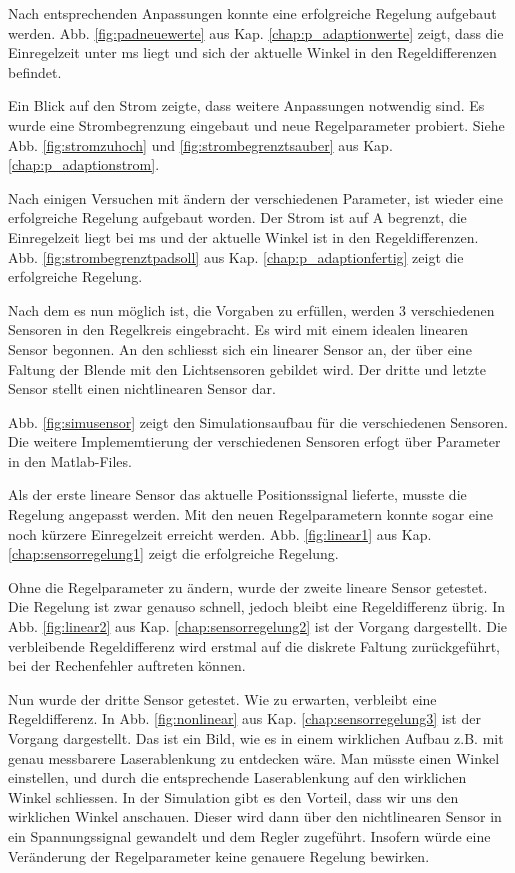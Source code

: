Nach entsprechenden Anpassungen konnte eine erfolgreiche Regelung aufgebaut werden.
Abb. \ref{fig:padneuewerte} aus Kap. \ref{chap:p_adaptionwerte} zeigt, dass die Einregelzeit unter \unit[1]{ms} liegt und sich der aktuelle Winkel in den Regeldifferenzen 
befindet.

Ein Blick auf den Strom zeigte, dass weitere Anpassungen notwendig sind.
Es wurde eine Strombegrenzung eingebaut und neue Regelparameter probiert.
Siehe Abb. \ref{fig:stromzuhoch} und \ref{fig:strombegrenztsauber} aus Kap. \ref{chap:p_adaptionstrom}.

Nach einigen Versuchen mit ändern der verschiedenen Parameter, ist wieder eine erfolgreiche Regelung aufgebaut worden.
Der Strom ist auf \unit[10]{A} begrenzt, die Einregelzeit liegt bei \unit[1]{ms} und der aktuelle Winkel ist in den Regeldifferenzen.
Abb. \ref{fig:strombegrenztpadsoll} aus Kap. \ref{chap:p_adaptionfertig} zeigt die erfolgreiche Regelung.

Nach dem es nun möglich ist, die Vorgaben zu erfüllen, werden 3 verschiedenen Sensoren in den Regelkreis eingebracht.
Es wird mit einem idealen linearen Sensor begonnen.
An den schliesst sich ein linearer Sensor an, der über eine Faltung der Blende mit den Lichtsensoren gebildet wird.
Der dritte und letzte Sensor stellt einen nichtlinearen Sensor dar.

Abb. \ref{fig:simusensor} zeigt den Simulationsaufbau für die verschiedenen Sensoren.
Die weitere Implememtierung der verschiedenen Sensoren erfogt über Parameter in den Matlab-Files.

Als der erste lineare Sensor das aktuelle Positionssignal lieferte, musste die Regelung angepasst werden.
Mit den neuen Regelparametern konnte sogar eine noch kürzere Einregelzeit erreicht werden.
Abb. \ref{fig:linear1} aus Kap. \ref{chap:sensorregelung1} zeigt die erfolgreiche Regelung.

Ohne die Regelparameter zu ändern, wurde der zweite lineare Sensor getestet.
Die Regelung ist zwar genauso schnell, jedoch bleibt eine Regeldifferenz übrig.
In Abb. \ref{fig:linear2} aus Kap. \ref{chap:sensorregelung2} ist der Vorgang dargestellt.
Die verbleibende Regeldifferenz wird erstmal auf die diskrete Faltung zurückgeführt, bei der Rechenfehler auftreten können.

Nun wurde der dritte Sensor getestet.
Wie zu erwarten, verbleibt eine Regeldifferenz.
In Abb. \ref{fig:nonlinear} aus Kap. \ref{chap:sensorregelung3} ist der Vorgang dargestellt.
Das ist ein Bild, wie es in einem wirklichen Aufbau z.B. mit genau messbarere Laserablenkung zu entdecken wäre.
Man müsste einen Winkel einstellen, und durch die entsprechende Laserablenkung auf den wirklichen Winkel schliessen.
In der Simulation gibt es den Vorteil, dass wir uns den wirklichen Winkel anschauen.
Dieser wird dann über den nichtlinearen Sensor in ein Spannungssignal gewandelt und dem Regler zugeführt.
Insofern würde eine Veränderung der Regelparameter keine genauere Regelung bewirken.